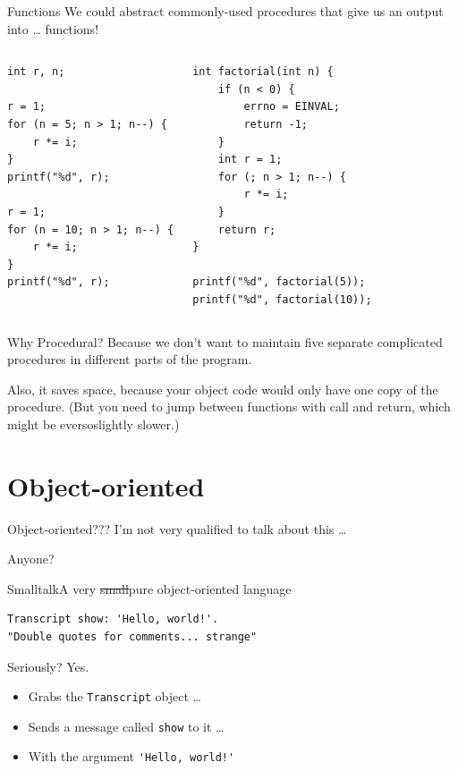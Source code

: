 \documentclass[aspectratio=169]{beamer}
\begin{document}
\begin{frame}[fragile]{Functions}
	We could abstract commonly-used procedures that give us an output into \ldots{} functions!
	\footnotesize
	\begin{columns}
		\begin{verbatim}
int r, n;

r = 1;
for (n = 5; n > 1; n--) {
	r *= i;
}
printf("%d", r);

r = 1;
for (n = 10; n > 1; n--) {
	r *= i;
}
printf("%d", r);
		\end{verbatim}
		\begin{verbatim}
int factorial(int n) {
	if (n < 0) {
		errno = EINVAL;
		return -1;
	}
	int r = 1;
	for (; n > 1; n--) {
		r *= i;
	}
	return r;
}

printf("%d", factorial(5));
printf("%d", factorial(10));
		\end{verbatim}
	\end{columns}
\end{frame}

\begin{frame}{Why Procedural?}
	Because we don't want to maintain five separate complicated procedures in different parts of the program.

	Also, it saves space, because your object code would only have one copy of the procedure. (But you need to jump between functions with call and return, which might be eversoslightly slower.)
\end{frame}

\section{Object-oriented}

\begin{frame}{Object-oriented???}
	\centering
	I'm not very qualified to talk about this \ldots

	\pause\bfseries\Huge

	Anyone?
\end{frame}

\begin{frame}[fragile]{{\small Small}talk}{A very \st{\tiny small}pure object-oriented language}
	\begin{verbatim}
Transcript show: 'Hello, world!'.
"Double quotes for comments... strange"
	\end{verbatim}

	\pause Seriously? \pause Yes.

	\begin{itemize}
		\item Grabs the \texttt{Transcript} object \ldots
		\item Sends a message called \texttt{show} to it \ldots
		\item With the argument \verb|'Hello, world!'|
	\end{itemize}
\end{frame}
\end{document}
